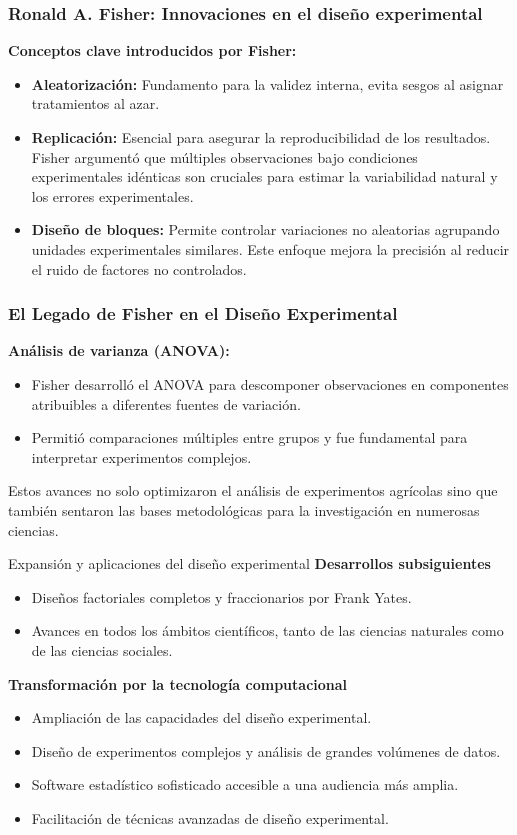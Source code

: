 ﻿\documentclass{beamer}
\begin{document}
\begin{frame}
\frametitle{Ronald A. Fisher: Innovaciones en el diseño experimental}
    \textbf{Conceptos clave introducidos por Fisher:}
    \begin{itemize}
        \item \textbf{Aleatorización:} Fundamento para la validez interna, evita sesgos al asignar tratamientos al azar.
        \item \textbf{Replicación:} Esencial para asegurar la reproducibilidad de los resultados. Fisher argumentó que múltiples observaciones bajo condiciones experimentales idénticas son cruciales para estimar la variabilidad natural y los errores experimentales.
        \item \textbf{Diseño de bloques:} Permite controlar variaciones no aleatorias agrupando unidades experimentales similares. Este enfoque mejora la precisión al reducir el ruido de factores no controlados.
    \end{itemize}

\end{frame}

\begin{frame}
\frametitle{El Legado de Fisher en el Diseño Experimental}
    \textbf{Análisis de varianza (ANOVA):}
    \begin{itemize}
        \item Fisher desarrolló el ANOVA para descomponer observaciones en componentes atribuibles a diferentes fuentes de variación.
        \item Permitió comparaciones múltiples entre grupos y fue fundamental para interpretar experimentos complejos.
    \end{itemize}
    
    Estos avances no solo optimizaron el análisis de experimentos agrícolas sino que también sentaron las bases metodológicas para la investigación en numerosas ciencias.
\end{frame}

\begin{frame}{Expansión y aplicaciones del diseño experimental}
    \textbf{Desarrollos subsiguientes}
    \begin{itemize}
        \item Diseños factoriales completos y fraccionarios por Frank Yates.
         \item Avances en todos los ámbitos científicos, tanto de las ciencias naturales como de las ciencias sociales.
    \end{itemize}
    \textbf{Transformación por la tecnología computacional}
    \begin{itemize}
        \item Ampliación de las capacidades del diseño experimental.
        \item Diseño de experimentos complejos y análisis de grandes volúmenes de datos.
        \item Software estadístico sofisticado accesible a una audiencia más amplia.
        \item Facilitación de técnicas avanzadas de diseño experimental.
    \end{itemize}
\end{frame}
\end{document}

